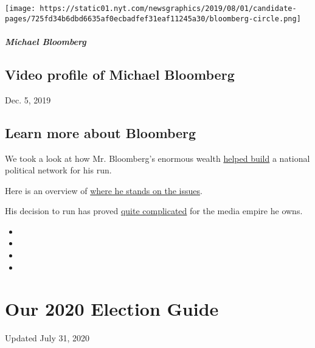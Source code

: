 \texttt{[image: https://static01.nyt.com/newsgraphics/2019/08/01/candidate-pages/725fd34b6dbd6635af0ecbadfef31eaf11245a30/bloomberg-circle.png]}

\hypertarget{michael-bloomberg-1}{%
\subparagraph{Michael Bloomberg}\label{michael-bloomberg-1}}

\hypertarget{video-profile-of-michael-bloomberg}{%
\subsection{Video profile of Michael
Bloomberg}\label{video-profile-of-michael-bloomberg}}

Dec. 5, 2019

\hypertarget{learn-more-about-bloomberg}{%
\subsection{Learn more about
Bloomberg}\label{learn-more-about-bloomberg}}

We took a look at how Mr. Bloomberg's enormous wealth
\href{https://www.nytimes.com/2019/12/14/us/politics/bloomberg-mayors-2020.html}{helped
build} a national political network for his run.

Here is an overview of
\href{https://www.nytimes.com/2019/11/08/us/politics/michael-bloomberg-issues.html}{where
he stands on the issues}.

His decision to run has proved
\href{https://www.nytimes.com/2019/11/24/business/bloomberg-media-presidential-campaign.html}{quite
complicated} for the media empire he owns.

\begin{itemize}
\item
\item
\item
\item
\end{itemize}

\hypertarget{our-2020-election-guide}{%
\section{Our 2020 Election Guide}\label{our-2020-election-guide}}

Updated July 31, 2020

